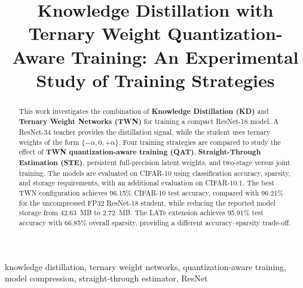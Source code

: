\documentclass[conference]{IEEEtran}
\begin{document}

\title{
Knowledge Distillation with Ternary Weight
Quantization-Aware Training:
An Experimental Study of Training Strategies
}

\author{
}

\maketitle


\begin{abstract}
This work investigates the combination of \textbf{Knowledge Distillation
(KD)} and \textbf{Ternary Weight Networks (TWN)} for training a compact
ResNet-18 model. A ResNet-34 teacher provides the distillation signal,
while the student uses ternary weights of the form
$\{-\alpha,0,+\alpha\}$. Four training strategies are compared to study
the effect of \textbf{TWN quantization-aware training (QAT)},
\textbf{Straight-Through Estimation (STE)}, persistent full-precision
latent weights, and two-stage versus joint training. The models are
evaluated on CIFAR-10 using classification accuracy, sparsity, and
storage requirements, with an additional evaluation on CIFAR-10.1.
The best TWN configuration achieves 96.15\% CIFAR-10 test accuracy,
compared with 96.21\% for the uncompressed FP32 ResNet-18 student, while
reducing the reported model storage from 42.63~MB to 2.72~MB. The LATe
extension achieves 95.91\% test accuracy with 66.85\% overall sparsity,
providing a different accuracy--sparsity trade-off.
\end{abstract}

\begin{IEEEkeywords}
knowledge distillation, ternary weight networks, quantization-aware
training, model compression, straight-through estimator, ResNet
\end{IEEEkeywords}

\end{document}
